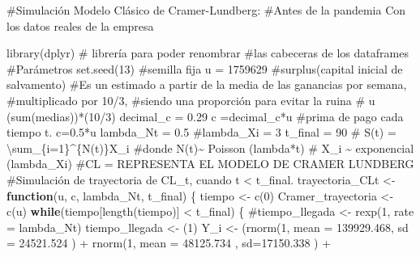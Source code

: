 \documentclass[
  us-letterpaper,
]{scrreprt}
\newenvironment{Shaded}{\begin{snugshade}}{\end{snugshade}}
\newcommand{\AttributeTok}[1]{\textcolor[rgb]{0.40,0.45,0.13}{#1}}
\newcommand{\CommentTok}[1]{\textcolor[rgb]{0.37,0.37,0.37}{#1}}
\newcommand{\ControlFlowTok}[1]{\textcolor[rgb]{0.00,0.23,0.31}{\textbf{#1}}}
\newcommand{\DecValTok}[1]{\textcolor[rgb]{0.68,0.00,0.00}{#1}}
\newcommand{\FloatTok}[1]{\textcolor[rgb]{0.68,0.00,0.00}{#1}}
\newcommand{\FunctionTok}[1]{\textcolor[rgb]{0.28,0.35,0.67}{#1}}
\newcommand{\NormalTok}[1]{\textcolor[rgb]{0.00,0.23,0.31}{#1}}
\newcommand{\OtherTok}[1]{\textcolor[rgb]{0.00,0.23,0.31}{#1}}
\newcommand{\SpecialCharTok}[1]{\textcolor[rgb]{0.37,0.37,0.37}{#1}}
\theoremstyle{plain}
\theoremstyle{plain}
\theoremstyle{definition}
\theoremstyle{remark}
\begin{document}
\begin{Shaded}
\begin{Highlighting}[]
\CommentTok{\#Simulación Modelo Clásico de Cramer{-}Lundberg: }
\CommentTok{\#Antes de la pandemia Con los datos reales de la empresa}

\FunctionTok{library}\NormalTok{(dplyr) }\CommentTok{\# librería para poder renombrar }
\CommentTok{\#las cabeceras de los dataframes}
\CommentTok{\#Parámetros}
\FunctionTok{set.seed}\NormalTok{(}\DecValTok{13}\NormalTok{) }\CommentTok{\#semilla fija}
\NormalTok{u }\OtherTok{=} \DecValTok{1759629} \CommentTok{\#surplus(capital inicial de salvamento)}
\CommentTok{\#Es un estimado a partir de la media de las ganancias por semana, }
\CommentTok{\#multiplicado por 10/3, }
\CommentTok{\#siendo una proporción para evitar la ruina}
\CommentTok{\# u (sum(medias))*(10/3)}
\NormalTok{decimal\_c }\OtherTok{=} \FloatTok{0.29}
\NormalTok{c }\OtherTok{=}\NormalTok{decimal\_c}\SpecialCharTok{*}\NormalTok{u }\CommentTok{\#prima de pago cada tiempo t. c=0.5*u}
\NormalTok{lambda\_Nt }\OtherTok{=} \FloatTok{0.5}
\CommentTok{\#lambda\_Xi = 3}
\NormalTok{t\_final }\OtherTok{=} \DecValTok{90}
\CommentTok{\# S(t) = \textbackslash{}sum\_\{i=1\}\^{}\{N(t)\}X\_i}
\CommentTok{\#donde N(t)\textasciitilde{} Poisson (lambda*t)}
\CommentTok{\# X\_i \textasciitilde{} exponencial (lambda\_Xi)}
\CommentTok{\#CL = REPRESENTA EL MODELO DE CRAMER LUNDBERG}
\CommentTok{\#Simulación de trayectoria de CL\_t, cuando t \textless{} t\_final.}
\NormalTok{trayectoria\_CLt }\OtherTok{\textless{}{-}} \ControlFlowTok{function}\NormalTok{(u, c, lambda\_Nt, t\_final)}
\NormalTok{\{}
\NormalTok{  tiempo }\OtherTok{\textless{}{-}} \FunctionTok{c}\NormalTok{(}\DecValTok{0}\NormalTok{)}
\NormalTok{  Cramer\_trayectoria }\OtherTok{\textless{}{-}} \FunctionTok{c}\NormalTok{(u)}
  \ControlFlowTok{while}\NormalTok{(tiempo[}\FunctionTok{length}\NormalTok{(tiempo)] }\SpecialCharTok{\textless{}}\NormalTok{ t\_final)}
\NormalTok{  \{}
    \CommentTok{\#tiempo\_llegada \textless{}{-} rexp(1, rate = lambda\_Nt)}
\NormalTok{    tiempo\_llegada }\OtherTok{\textless{}{-}}\NormalTok{ (}\DecValTok{1}\NormalTok{)}
\NormalTok{    Y\_i }\OtherTok{\textless{}{-}}\NormalTok{  (}\FunctionTok{rnorm}\NormalTok{(}\DecValTok{1}\NormalTok{, }\AttributeTok{mean =} \FloatTok{139929.468}\NormalTok{, }\AttributeTok{sd =} \FloatTok{24521.524}\NormalTok{ ) }\SpecialCharTok{+}
            \FunctionTok{rnorm}\NormalTok{(}\DecValTok{1}\NormalTok{, }\AttributeTok{mean =} \FloatTok{48125.734}\NormalTok{ , }\AttributeTok{sd=}\FloatTok{17150.338}\NormalTok{ )    }\SpecialCharTok{+}  

\end{Highlighting}
\end{Shaded}
\end{document}

